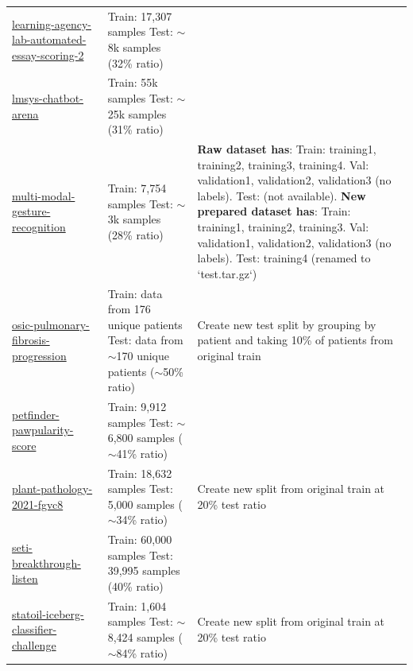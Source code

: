 \documentclass{article} %
\begin{document}
\begin{longtable}{m{4cm} m{4.5cm} m{4cm}}
    \href{https://www.kaggle.com/c/learning-agency-lab-automated-essay-scoring-2}{learning-agency-lab-automated-essay-scoring-2} &  Train: 17,307 samples \newline  Test: $\sim$8k samples (32\% ratio) & \\
    \href{https://www.kaggle.com/c/lmsys-chatbot-arena}{lmsys-chatbot-arena} &  Train: 55k samples \newline  Test: $\sim$25k samples (31\% ratio) & \\
    \href{https://www.kaggle.com/c/multi-modal-gesture-recognition}{multi-modal-gesture-recognition} &  Train: 7,754 samples \newline  Test: $\sim$3k samples (28\% ratio) & \textbf{Raw dataset has}: Train: training1, training2, training3, training4. Val: validation1, validation2, validation3 (no labels). Test: (not available). \newline \textbf{New prepared dataset has}: Train: training1, training2, training3. Val: validation1, validation2, validation3 (no labels). Test: training4 (renamed to `test.tar.gz`)\\
    \href{https://www.kaggle.com/c/osic-pulmonary-fibrosis-progression}{osic-pulmonary-fibrosis-progression} &  Train: data from 176 unique patients
 \newline  Test: data from $\sim$170 unique patients ($\sim$50\% ratio) & Create new test split by grouping by patient and taking 10\% of patients from original train \\
    \href{https://www.kaggle.com/c/petfinder-pawpularity-score}{petfinder-pawpularity-score} &  Train: 9,912 samples \newline  Test: $\sim$6,800 samples ($\sim$41\% ratio) & \\
    \href{https://www.kaggle.com/c/plant-pathology-2021-fgvc8}{plant-pathology-2021-fgvc8} &  Train: 18,632 samples \newline  Test: 5,000 samples ($\sim$34\% ratio) & Create new split from original train at 20\% test ratio \\
    \href{https://www.kaggle.com/c/seti-breakthrough-listen}{seti-breakthrough-listen} &  Train: 60,000 samples \newline  Test: 39,995 samples (40\% ratio) & \\
    \href{https://www.kaggle.com/c/statoil-iceberg-classifier-challenge}{statoil-iceberg-classifier-challenge} &  Train: 1,604 samples \newline  Test: $\sim$8,424 samples ($\sim$84\% ratio) & Create new split from original train at 20\% test ratio \\

\end{longtable}
\end{document}
